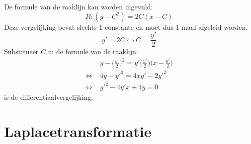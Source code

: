 \documentclass[12pt]{report}
\begin{document}
{\begin{enumerate}
  De formule van de raaklijn kan worden ingevuld:
  $$R: (y - C^2) = 2C(x - C)$$
  Deze vergelijking bevat slechts 1 constante en moet dus 1 maal afgeleid worden.
  $$y' = 2C \Leftrightarrow C = \frac{y'}{2}$$
  Substitueer $C$ in de formule van de raaklijn:
  \begin{equation*}
   \begin{split}
    & y - \bigg(\frac{y'}{2}\bigg)^2 = y'\bigg(\frac{y'}{2}\bigg)\bigg(x - \frac{y'}{2}\bigg) \\
    \Leftrightarrow \; & 4y - y'^2 = 4xy' - 2y'^2 \\
    \Leftrightarrow \; & y'^2 - 4y'x + 4y = 0
   \end{split}
  \end{equation*}
  is de differentiaalvergelijking.
\end{enumerate}
}

\chapter{Laplacetransformatie}
\end{document}
